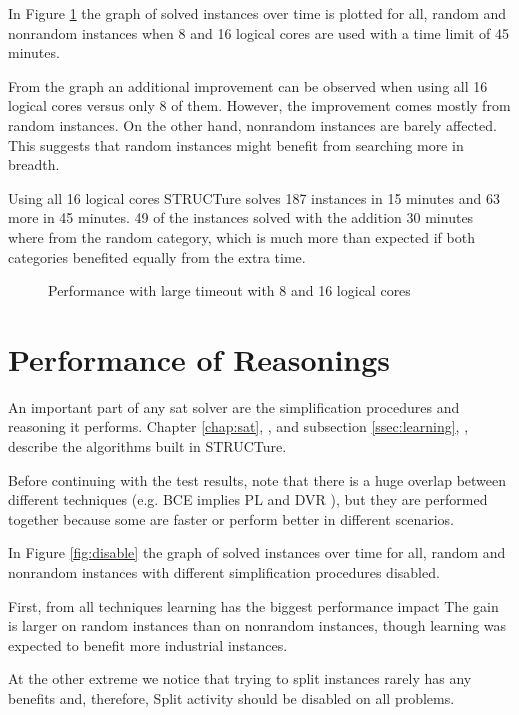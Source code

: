 In Figure \ref{fig:large} the graph of solved instances over time is
plotted for all, random and nonrandom instances when 8 and 16
logical cores are used with a time limit of 45 minutes.

From the graph an additional improvement can be observed when using
all 16 logical cores versus only 8 of them. However, the improvement
comes mostly from random instances. On the other hand, nonrandom
instances are barely affected. This suggests that random instances
might benefit from searching more in breadth. 

Using all 16 logical cores STRUCTure solves 187 instances in
15 minutes and 63 more in 45 minutes. 49 of the instances solved
with the addition 30 minutes where from the random category, which
is much more than expected if both categories benefited
equally from the extra time.

\begin{figure}
  \centering
  \caption{Performance with large timeout with 8 and 16 logical cores}
  \label{fig:large}
\end{figure}


\section{Performance of Reasonings}

An important part of any sat solver are the simplification
procedures and reasoning it performs. Chapter \ref{chap:sat},
, and subsection \ref{ssec:learning},
, describe the algorithms built in STRUCTure.

Before continuing with the test results, note
that there is a huge overlap between different techniques (e.g. BCE
implies PL and DVR \cite{Jarvisalo_blockedclause}), but they are
performed together because some are faster or perform better in
different scenarios.

In Figure \ref{fig:disable} the graph of solved instances over time
for all, random and nonrandom instances with different simplification
procedures disabled.

First, from all techniques learning has the biggest performance
impact The gain is larger on random instances than on nonrandom
instances, though learning was expected to benefit more industrial
instances\cite{DBLP:series/faia/SilvaLM09}.

At the other extreme we notice that trying to split instances rarely
has any benefits and, therefore, Split activity should be disabled
on all problems.

